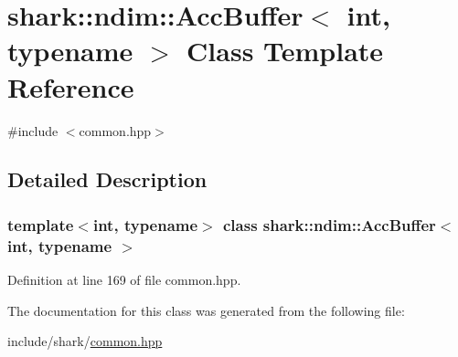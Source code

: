 \hypertarget{classshark_1_1ndim_1_1_acc_buffer}{}\section{shark\+:\+:ndim\+:\+:Acc\+Buffer$<$ int, typename $>$ Class Template Reference}
\label{classshark_1_1ndim_1_1_acc_buffer}


{\ttfamily \#include $<$common.\+hpp$>$}



\subsection{Detailed Description}
\subsubsection*{template$<$int, typename$>$\newline
class shark\+::ndim\+::\+Acc\+Buffer$<$ int, typename $>$}



Definition at line 169 of file common.\+hpp.



The documentation for this class was generated from the following file\+:\begin{DoxyCompactItemize}
\item 
include/shark/\hyperlink{common_8hpp}{common.\+hpp}\end{DoxyCompactItemize}
